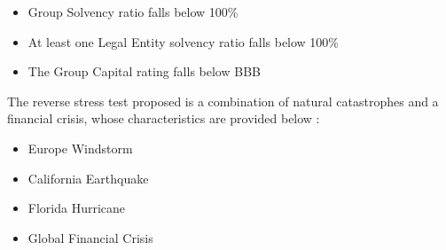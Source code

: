\begin{itemize}
\item Group Solvency ratio falls below 100\%
\item At least one Legal Entity solvency ratio falls below 100\%
\item The Group Capital rating falls below BBB
\end{itemize}


The reverse stress test proposed is a combination of natural catastrophes and a financial crisis, whose characteristics are provided below :

\begin{itemize}
\item Europe Windstorm
\item California Earthquake
\item Florida Hurricane
\item Global Financial Crisis
\end{itemize}



